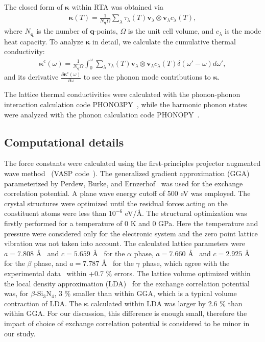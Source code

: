 \documentclass[twocolumn,amsmath,amssymb,a4paper,prb,superscriptaddress,floatfix]{revtex4-1}
\begin{document}
The closed form of $\boldsymbol{\kappa}$ within RTA was obtained via
\begin{align}
 \label{eq:kappa}
 \boldsymbol{\kappa}(T) = \frac{1}{N_\mathbf{q}\Omega} \sum_\lambda
 \tau_\lambda(T) \mathbf{v}_\lambda \otimes \mathbf{v}_\lambda c_\lambda(T),
\end{align}
where $N_\mathbf{q}$ is the number of
$\mathbf{q}$-points, $\Omega$ is the unit cell volume, and $c_\lambda$
is the mode heat capacity. To analyze $\boldsymbol{\kappa}$ in detail, we calculate
the cumulative thermal conductivity:
\begin{align}
 \label{eq:cum-kappa}
 \boldsymbol{\kappa}^\text{c}(\omega) = \frac{1}{N_\mathbf{q}\Omega}
 \int_0^\omega \sum_\lambda
 \tau_\lambda(T) \mathbf{v}_\lambda \otimes \mathbf{v}_\lambda
 c_\lambda(T) \delta(\omega'-\omega)d\omega',
\end{align}
and its derivative $\frac{\partial
\boldsymbol{\kappa}^\text{c}(\omega)}{\partial \omega}$ to see the phonon mode
contributions to $\boldsymbol{\kappa}$.

The lattice thermal conductivities were calculated with the phonon-phonon interaction calculation code
PHONO3PY~\cite{phono3py}, while the harmonic phonon states were analyzed with
the phonon calculation code PHONOPY~\cite{phonopy}.

\subsection{Computational details}

The force constants were calculated using the first-principles projector
augmented wave method~\cite{paw} (VASP code~\cite{vasp-1996,vasp-1995,
vasp-1999}). The generalized gradient approximation (GGA) parameterized by
Perdew, Burke, and Ernzerhof~\cite{pbe} was used for the exchange correlation
potential. A plane wave energy cutoff of 500 eV was employed. The crystal
structures were optimized until the residual forces acting
on the constituent atoms were less than $10^{-6}$ eV/\AA. The structural
optimization was firstly performed for a temperature of 0 K and 0 GPa. Here the
temperature and pressure were considered only for the electronic system and the
zero point lattice vibration was not taken into account. The calculated lattice
parameters were $a=7.808$ \AA~ and $c=5.659$ \AA~ for the $\alpha$ phase,
$a=7.660$ \AA~ and $c=2.925$ \AA~ for the $\beta$ phase, and $a=7.787$ \AA~
for the $\gamma$ phase, which agree with the experimental
data~\cite{yashima,boulay,paszkowicz} within +0.7 \% errors. The lattice
volume optimized within the local density approximation
(LDA)~\cite{lda} for the exchange correlation potential was, for
$\beta$-Si$_3$N$_4$, 3 \% smaller than within GGA, which is a typical
volume contraction of LDA. The $\boldsymbol{\kappa}$ calculated within LDA was larger by 2.6 \% than within GGA. For
our discussion, this difference is enough small, therefore the impact of
choice of exchange correlation potential is considered to be minor in our
study.
\end{document}
